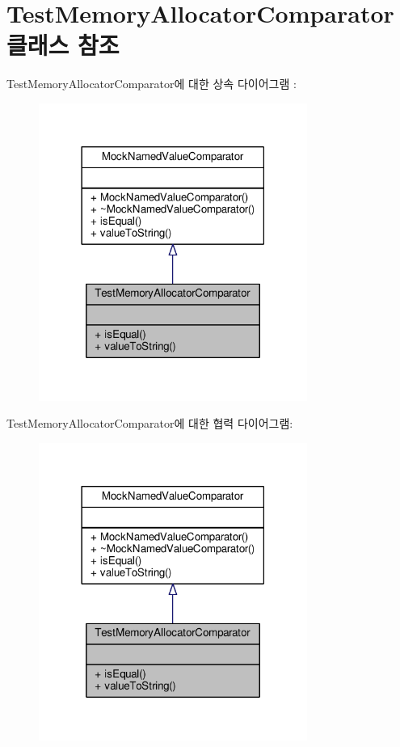 \hypertarget{class_test_memory_allocator_comparator}{}\section{Test\+Memory\+Allocator\+Comparator 클래스 참조}
\label{class_test_memory_allocator_comparator}


Test\+Memory\+Allocator\+Comparator에 대한 상속 다이어그램 \+: 
\nopagebreak
\begin{figure}[H]
\begin{center}
\leavevmode
\includegraphics[width=249pt]{class_test_memory_allocator_comparator__inherit__graph}
\end{center}
\end{figure}


Test\+Memory\+Allocator\+Comparator에 대한 협력 다이어그램\+:
\nopagebreak
\begin{figure}[H]
\begin{center}
\leavevmode
\includegraphics[width=249pt]{class_test_memory_allocator_comparator__coll__graph}
\end{center}
\end{figure}
